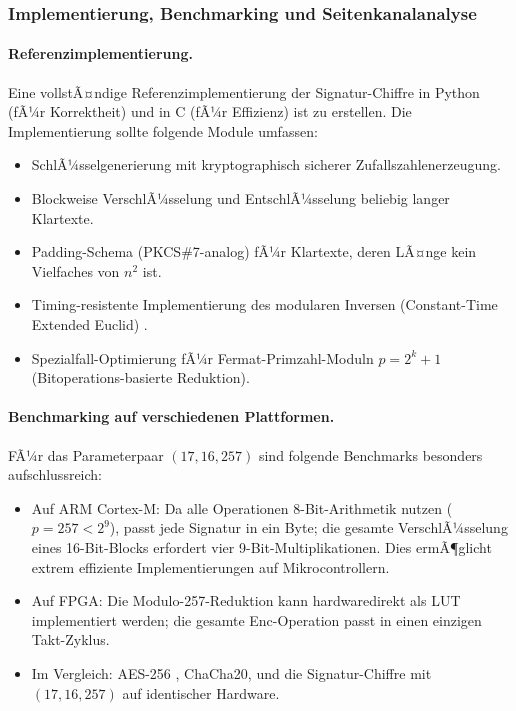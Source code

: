 ﻿\documentclass[a4paper,12pt]{scrreprt}
\theoremstyle{definition}
\begin{document}
\subsubsection{Implementierung, Benchmarking und Seitenkanalanalyse}

\paragraph{Referenzimplementierung.}
Eine vollstÃ¤ndige Referenzimplementierung der Signatur-Chiffre in Python (fÃ¼r Korrektheit) und in C (fÃ¼r Effizienz) ist zu erstellen. Die Implementierung sollte folgende Module umfassen:
\begin{itemize}
    \item SchlÃ¼sselgenerierung mit kryptographisch sicherer Zufallszahlenerzeugung.
    \item Blockweise VerschlÃ¼sselung und EntschlÃ¼sselung beliebig langer Klartexte.
    \item Padding-Schema (PKCS\#7-analog) fÃ¼r Klartexte, deren LÃ¤nge kein Vielfaches von $n^2$ ist.
    \item Timing-resistente Implementierung des modularen Inversen (Constant-Time Extended Euclid) \cite{Koc96}.
    \item Spezialfall-Optimierung fÃ¼r Fermat-Primzahl-Moduln $p = 2^k + 1$ (Bitoperations-basierte Reduktion).
\end{itemize}

\paragraph{Benchmarking auf verschiedenen Plattformen.}
FÃ¼r das Parameterpaar $(17, 16, 257)$ sind folgende Benchmarks besonders aufschlussreich:
\begin{itemize}
  \item Auf ARM Cortex-M: Da alle Operationen 8-Bit-Arithmetik nutzen ($p = 257 < 2^9$), passt jede Signatur in ein Byte; die gesamte VerschlÃ¼sselung eines 16-Bit-Blocks erfordert vier 9-Bit-Multiplikationen. Dies ermÃ¶glicht extrem effiziente Implementierungen auf Mikrocontrollern.
  \item Auf FPGA: Die Modulo-257-Reduktion kann hardwaredirekt als LUT implementiert werden; die gesamte Enc-Operation passt in einen einzigen Takt-Zyklus.
  \item Im Vergleich: AES-256 \cite{DR02}, ChaCha20, und die Signatur-Chiffre mit $(17,16,257)$ auf identischer Hardware.
\end{itemize}
\end{document}
